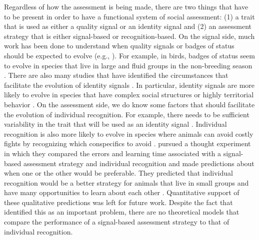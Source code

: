 Regardless of how the assessment is being made, there are two things that have to be present in order to have a functional system of social assessment: (1) a trait that is used as either a quality signal or an identity signal and (2) an assessment strategy that is either signal-based or recognition-based.  On the signal side, much work has been done to understand when quality signals or badges of status should be expected to evolve (e.g., \citep{Whitfield:1987tg,Rohwer:1975fk,Rohwer:1982fk,Dawkins:1991ly,Johnstone:1995vn,Lachmann:1998fk,Tibbetts:2009kx}). For example, in birds, badges of status seem to evolve in species that live in large and fluid groups in the non-breeding season \citep{Tibbetts:2009kx}. There are also many studies that have identified the circumstances that facilitate the evolution of identity signals \citep{Rohwer:1975fk,Whitfield:1987tg,Sheehan:2009we,Pollard:2011te,Sheehan:2014fk}. In particular, identity signals are more likely to evolve in species that have complex social structures or highly territorial behavior \citep{Tibbetts2007IndividualDifferent}. On the assessment side, we do know some factors that should facilitate the evolution of individual recognition. For example, there needs to be sufficient variability in the trait that will be used as an identity signal \citep{Sheehan:2014fk}. Individual recognition is also more likely to evolve in species where animals can avoid costly fights by recognizing which conspecifics to avoid \citep{DEttorre:2005nu}.  \citet{sheehan2016evotradeoff} pursued a thought experiment in which they compared the errors and learning time associated with a signal-based assessment strategy and individual recognition and made predictions about when one or the other would be preferable. 
They predicted that individual recognition would be a better strategy for animals that live in small groups and have many opportunities to learn about each other \citep{sheehan2016evotradeoff}. Quantitative support of these qualitative predictions was left for future work. Despite the fact that \citet{sheehan2016evotradeoff} identified this as an important problem, there are no theoretical models that compare the performance of a signal-based assessment strategy to that of individual recognition. 

